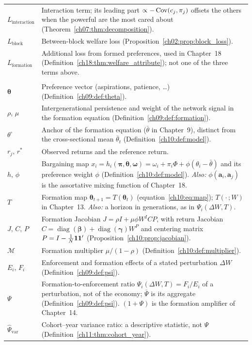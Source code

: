 {\begin{longtable}{@{}>{\raggedright\arraybackslash}p{3.2cm}>{\raggedright\arraybackslash}p{11.3cm}@{}}
$L_{\text{interaction}}$ & Interaction term; its leading part $\propto -\operatorname{Cov}(c_j, \pi_j)$ offsets the others when the powerful are the most cared about (Theorem~\ref{ch07:thm:decomposition}). \\
$L_{\text{block}}$ & Between-block welfare loss (Proposition~\ref{ch02:prop:block_loss}). \\
$L_{\text{formation}}$ & Additional loss from formed preferences, used in Chapter~18 (Definition~\ref{ch18:thm:welfare_attribute}); not one of the three terms above. \\[4pt]

\multicolumn{2}{@{}l}{\textit{Preference formation}} \\[2pt]
$\boldsymbol{\theta}$ & Preference vector (aspirations, patience, \ldots) (Definition~\ref{ch09:def:theta}). \\
$\rho$, $\mu$ & Intergenerational persistence and weight of the network signal in the formation equation (Definition~\ref{ch09:def:formation}). \\
$\theta^{\circ}$ & Anchor of the formation equation ($\bar\theta$ in Chapter~9), distinct from the cross-sectional mean $\bar\theta_t$ (Definition~\ref{ch10:def:model}). \\
$r_j$, $r^*$ & Observed returns and the reference return. \\
$h$, $\phi$ & Bargaining map $x_i = h_i(\boldsymbol{\pi}, \boldsymbol{\theta}, \boldsymbol{\omega}) = \omega_i + \pi_i\Phi + \phi(\theta_i - \bar\theta)$ and its preference weight $\phi$ (Definition~\ref{ch10:def:model}). \textit{Also:} $\phi(\mathbf{a}_i, \mathbf{a}_j)$ is the assortative mixing function of Chapter~18. \\
$T$ & Formation map $\boldsymbol{\theta}_{t+1} = T(\boldsymbol{\theta}_t)$ (equation~\eqref{ch10:eq:map}); $T(\cdot\,; W)$ in Chapter~13. \textit{Also:} a horizon in generations, as in $\Psi_i(\Delta W, T)$. \\
$J$, $C$, $P$ & Formation Jacobian $J = \rho I + \mu\phi W^I C P$, with return Jacobian $C = \operatorname{diag}(\boldsymbol{\beta}) + \operatorname{diag}(\boldsymbol{\gamma})W^P$ and centering matrix $P = I - \frac{1}{N}\mathbf{1}\mathbf{1}'$ (Proposition~\ref{ch10:prop:jacobian}). \\
$\mathcal{M}$ & Formation multiplier $\mu/(1-\rho)$ (Definition~\ref{ch10:def:multiplier}). \\
$E_i$, $F_i$ & Enforcement and formation effects of a stated perturbation $\Delta W$ (Definition~\ref{ch09:def:psi}). \\
$\Psi$ & Formation-to-enforcement ratio $\Psi_i(\Delta W, T) = F_i/E_i$ of a perturbation, not of the economy; $\bar\Psi$ is its aggregate (Definition~\ref{ch09:def:psi}). $(1+\Psi)$ is the formation amplifier of Chapter~14. \\
$\hat\Psi_{\text{var}}$ & Cohort--year variance ratio: a descriptive statistic, not $\Psi$ (Definition~\ref{ch11:thm:cohort_year}). \\[4pt]


\end{longtable}}
